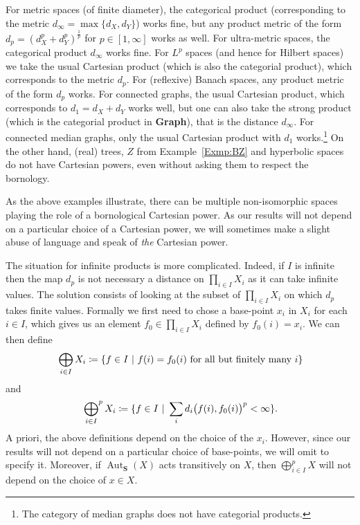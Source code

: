 \documentclass[a4paper]{article}
\newcounter{mycomment}
\newcommand{\mycomment}[2][]{\refstepcounter{mycomment}{\todo[color={green!33},size=\small]{\textbf{Commentaire [\uppercase{#1}\themycomment]:}~#2}}}
\newcommand{\GS}[1]{\mycomment[GS]{#1}}
\theoremstyle{definition}
\DeclareMathOperator\Aut{Aut}
\newcommand*{\category}[1]{\textbf{#1}}
\newcommand*{\CatS}{\category{S}}
\newcommand{\setst}[2]{\{#1\ |\ #2\}}
\begin{document}
For metric spaces (of finite diameter), the categorical product (corresponding to the metric $d_\infty=\max\{d_X,d_Y\}$) works fine, but any product metric of the form $d_p=(d_X^p+d_Y^p)^{\frac1p}$ for $p\in[1,\infty]$ works as well.
For ultra-metric spaces, the categorical product $d_\infty$ works fine.
For $L^p$ spaces (and hence for Hilbert spaces) we take the usual Cartesian product (which is also the categorial product), which corresponds to the metric $d_p$.
For (reflexive) Banach spaces, any product metric of the form $d_p$ works.
For connected graphs, the usual Cartesian product, which corresponds to $d_1=d_X+d_Y$ works well, but one can also take the strong product (which is the categorial product in \category{Graph}), that is the distance $d_\infty$.
For connected median graphs, only the usual Cartesian product with $d_1$ works.\footnote{The category of median graphs does not have categorial products.}
On the other hand, (real) trees, $Z$ from Example~\ref{Exmp:BZ} and hyperbolic spaces do not have Cartesian powers, even without asking them to respect the bornology.

As the above examples illustrate, there can be multiple non-isomorphic spaces playing the role of a bornological Cartesian power. As our results will not depend on a particular choice of a Cartesian power, we will sometimes make a slight abuse of language and speak of \emph{the} Cartesian power.

The situation for infinite products is more complicated. Indeed, if $I$ is infinite then the map $d_p$ is not necessary a distance on $\prod_{i\in I}X_i$ as it can take infinite values.
The solution consists of looking at the subset of $\prod_{i\in I}X_i$ on which $d_p$ takes finite values.
Formally we first need to chose a base-point $x_i$ in $X_i$ for each $i\in I$, which gives us an element $f_0\in \prod_{i\in I}X_i$ defined by $f_0(i)=x_i$. We can then define
\begin{equation*}
\sideset{}{}\bigoplus_{i \in I}X_i \coloneqq\setst{f\in I}{f(i)=f_0(i)\textnormal{ for all but finitely many }i}
\end{equation*}
and%
\begin{equation*}
\sideset{}{^p}\bigoplus_{i \in I}X_i \coloneqq\setst{f\in I}{\sum_i d_i\bigl(f(i),f_0(i)\bigr)^p<\infty}.
\end{equation*}
A priori, the above definitions depend on the choice of the $x_i$. However, since our results will not depend on a particular choice of base-points, we will omit to specify it.
Moreover, if $\Aut_\CatS(X)$ acts transitively on $X$, then $\bigoplus_{i \in I}^pX$ will not depend on the choice of $x\in X$.
\end{document}
